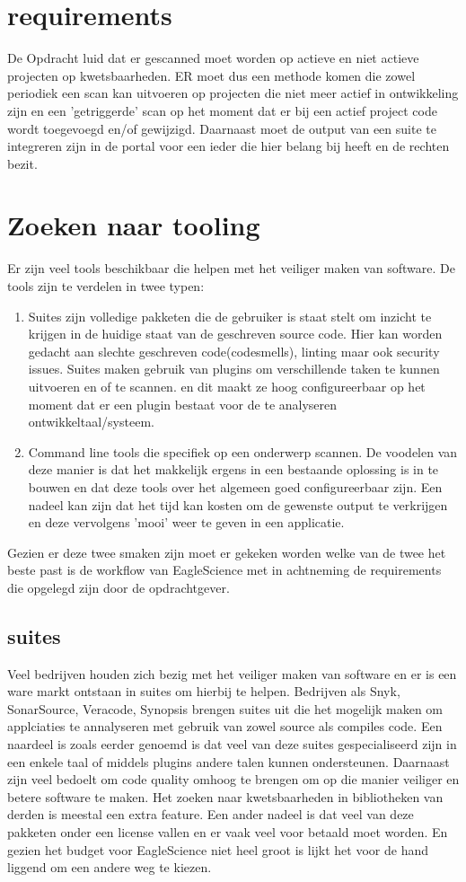 \section{requirements}
De Opdracht luid dat er gescanned moet worden op actieve en niet actieve projecten op kwetsbaarheden. ER moet dus een methode komen die zowel periodiek een scan kan uitvoeren op projecten die niet meer actief in ontwikkeling zijn en een 'getriggerde' scan op het moment dat er bij een actief project code wordt toegevoegd en/of gewijzigd. Daarnaast moet de output van een suite te integreren zijn in de portal voor een ieder die hier belang bij heeft en de rechten bezit.



\section{Zoeken naar tooling}
Er zijn veel tools beschikbaar die helpen met het veiliger maken van software. De tools zijn te verdelen in twee typen:
\begin{enumerate}
    \item Suites zijn volledige pakketen die de gebruiker is staat stelt om inzicht te krijgen in de huidige staat van de geschreven source code. Hier kan worden gedacht aan slechte geschreven code(codesmells), linting maar ook security issues. Suites maken gebruik van plugins om verschillende taken te kunnen uitvoeren en of te scannen. en dit maakt ze hoog configureerbaar op het moment dat er een plugin bestaat voor de te analyseren ontwikkeltaal/systeem.
    \item Command line tools die specifiek op een onderwerp scannen. De voodelen van deze manier is dat het makkelijk ergens in een bestaande oplossing is in te bouwen en dat deze tools over het algemeen goed configureerbaar zijn. Een nadeel kan zijn dat het tijd kan kosten om de gewenste output te verkrijgen en deze vervolgens 'mooi' weer te geven in een applicatie.
\end{enumerate}
Gezien er deze twee smaken zijn moet er gekeken worden welke van de twee het beste past is de workflow van EagleScience met in achtneming de requirements die opgelegd zijn door de opdrachtgever.

\subsection{suites}
Veel bedrijven houden zich bezig met het veiliger maken van software en er is een ware markt ontstaan in suites om hierbij te helpen. Bedrijven als Snyk, SonarSource, Veracode, Synopsis brengen suites uit die het mogelijk maken om applciaties te annalyseren met gebruik van zowel source als compiles code. Een naardeel is zoals eerder genoemd is dat veel van deze suites gespecialiseerd zijn in een enkele taal of middels plugins andere talen kunnen ondersteunen. Daarnaast zijn veel bedoelt om code quality omhoog te brengen om op die manier veiliger en betere software te maken. Het zoeken naar kwetsbaarheden in bibliotheken van derden is meestal een extra feature. Een ander nadeel is dat veel van deze pakketen onder een license vallen en er vaak veel voor betaald moet worden. En gezien het budget voor EagleScience niet heel groot is lijkt het voor de hand liggend om een andere weg te kiezen.
